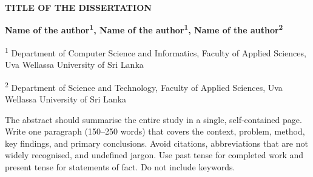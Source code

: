 \begin{center}
    \textbf{\uppercase{TITLE OF THE DISSERTATION}}

    \vspace{\baselineskip}

    \textbf{Name of the author\textsuperscript{1}, Name of the author\textsuperscript{1}, Name of the author\textsuperscript{2}}

    \vspace{\baselineskip}

    \footnotesize \textsuperscript{1} Department of Computer Science and Informatics, Faculty of Applied Sciences, Uva Wellassa University of Sri Lanka
    
    \footnotesize \textsuperscript{2} Department of Science and Technology, Faculty of Applied Sciences, Uva Wellassa University of Sri Lanka
\end{center}

The abstract should summarise the entire study in a single, self-contained
page. Write one paragraph (150--250 words) that covers the context, problem,
method, key findings, and primary conclusions. Avoid citations, abbreviations
that are not widely recognised, and undefined jargon. Use past tense for
completed work and present tense for statements of fact. Do not include keywords.

\clearpage
